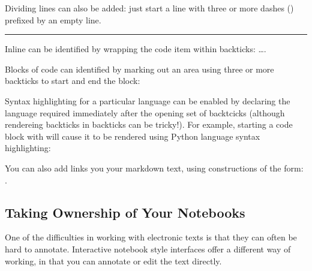 \documentclass[letterpaper,10pt,english]{sphinxmanual}
\begin{document}
Dividing lines can also be added: just start a line with three or more dashes (\sphinxcode{\sphinxupquote{\sphinxhyphen{}\sphinxhyphen{}\sphinxhyphen{}}}) prefixed by an empty line.


\bigskip\hrule\bigskip


Inline  can be identified by wrapping the code item within backticks: \textasciigrave{}…{\color{red}\bfseries{}\textasciigrave{}}.

Blocks of code can identified by marking out an area using three or more backticks to start and end the block:

\begin{sphinxVerbatim}[commandchars=\\\{\}]
 

\end{sphinxVerbatim}

Syntax highlighting for a particular language can be enabled by declaring the language required immediately after the opening set of backtcicks (although rendereing backticks in backticks can be tricky!). For example, starting a code block with  will cause it to be rendered using Python language syntax highlighting:

\begin{sphinxVerbatim}[commandchars=\\\{\}]
 

\end{sphinxVerbatim}

You can also add links you your markdown text, using constructions of the form: .


\subsection{Taking Ownership of Your Notebooks}
\label{\detokenize{content/00_READ_ME_FIRST/Section_00_06_RoboLab_Environment:Taking-Ownership-of-Your-Notebooks}}
One of the difficulties in working with electronic texts is that they can often be hard to annotate. Interactive notebook style interfaces offer a different way of working, in that you can annotate or edit the text directly.
\end{document}
